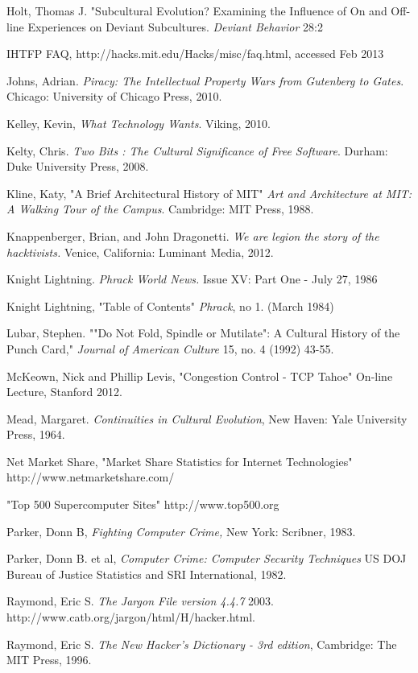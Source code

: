 \documentclass[11pt]{article}
\begin{document}
\begin{hangparas}{15pt}{1}
Holt, Thomas J. "Subcultural Evolution? Examining the Influence of On and Off-line Experiences on Deviant Subcultures. \emph{Deviant Behavior} 28:2

IHTFP FAQ,  http://hacks.mit.edu/Hacks/misc/faq.html, accessed Feb 2013

Johns, Adrian. \emph{Piracy: The Intellectual Property Wars from Gutenberg to Gates}. Chicago: University of Chicago Press, 2010.

Kelley, Kevin, \emph{What Technology Wants}. Viking, 2010.

Kelty, Chris. \emph{Two Bits : The Cultural Significance of Free Software}. Durham: Duke University Press, 2008.

Kline, Katy, "A Brief Architectural History of MIT" \emph{Art and Architecture at MIT: A Walking Tour of the Campus}. Cambridge: MIT Press, 1988.

Knappenberger, Brian, and John Dragonetti. \emph{We are legion the story of the hacktivists.} Venice, California: Luminant Media, 2012.

Knight Lightning. \emph{Phrack World News.} Issue XV: Part One -  July 27, 1986

Knight Lightning, "Table of Contents" \emph{Phrack}, no 1. (March 1984)

Lubar, Stephen. ""Do Not Fold, Spindle or Mutilate": A Cultural History of the Punch Card," \emph{Journal of American Culture} 15, no. 4 (1992) 43-55.

McKeown, Nick and Phillip Levis, "Congestion Control - TCP Tahoe" On-line Lecture, Stanford 2012.

Mead, Margaret. \emph{Continuities in Cultural Evolution}, New Haven: Yale University Press, 1964.

Net Market Share, "Market Share Statistics for Internet Technologies" http://www.netmarketshare.com/ 

"Top 500 Supercomputer Sites" http://www.top500.org

Parker, Donn B, \emph{Fighting Computer Crime,} New York: Scribner, 1983.

Parker, Donn B. et al, \emph{Computer Crime: Computer Security Techniques} US DOJ Bureau of Justice Statistics and SRI International, 1982.

Raymond, Eric S. \emph{The Jargon File version 4.4.7} 2003.  http://www.catb.org/jargon/html/H/hacker.html.

Raymond, Eric S. \emph{The New Hacker's Dictionary - 3rd edition}, Cambridge: The MIT Press, 1996.


\end{hangparas}
\end{document}
